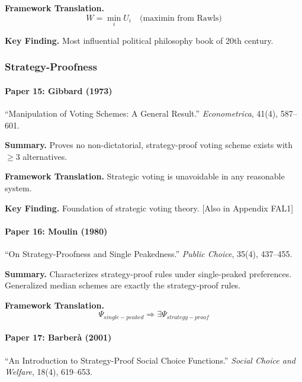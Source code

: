 \textbf{Framework Translation.}
\begin{equation}
W = \min_i U_i \quad \text{(maximin from Rawls)}
\end{equation}

\textbf{Key Finding.}
Most influential political philosophy book of 20th century.

\subsubsection{Strategy-Proofness}

\paragraph{Paper 15: Gibbard (1973)}

``Manipulation of Voting Schemes: A General Result.''
\textit{Econometrica}, 41(4), 587--601.

\textbf{Summary.}
Proves no non-dictatorial, strategy-proof voting scheme exists with 
$\geq 3$ alternatives.

\textbf{Framework Translation.}
Strategic voting is unavoidable in any reasonable system.

\textbf{Key Finding.}
Foundation of strategic voting theory. [Also in Appendix FAL1]

\paragraph{Paper 16: Moulin (1980)}

``On Strategy-Proofness and Single Peakedness.''
\textit{Public Choice}, 35(4), 437--455.

\textbf{Summary.}
Characterizes strategy-proof rules under single-peaked preferences.
Generalized median schemes are exactly the strategy-proof rules.

\textbf{Framework Translation.}
\begin{equation}
\Psi_{single-peaked} \Rightarrow \exists \Psi_{strategy-proof}
\end{equation}

\paragraph{Paper 17: Barberà (2001)}

``An Introduction to Strategy-Proof Social Choice Functions.''
\textit{Social Choice and Welfare}, 18(4), 619--653.

